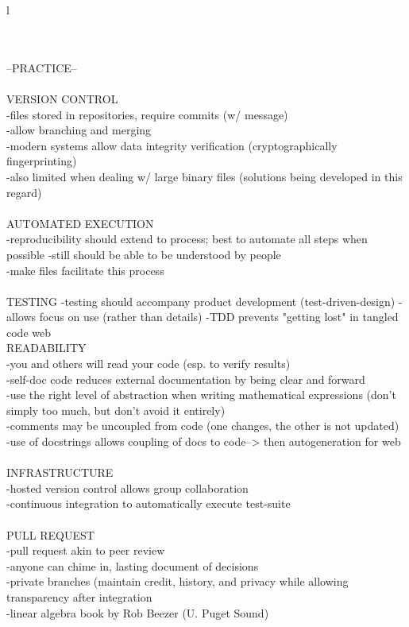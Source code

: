 l\documentclass{report}
\begin{document}
\-\\
\-\\
--PRACTICE--\\
\-\\
VERSION CONTROL\\
-files stored in repositories, require commits (w/ message)\\
-allow branching and merging\\
-modern systems allow data integrity verification (cryptographically fingerprinting)\\
-also limited when dealing w/ large binary files (solutions being developed in this regard)\\ 
\-\\
AUTOMATED EXECUTION\\
-reproducibility should extend to process; best to automate all steps when possible
-still should be able to be understood by people\\
-make files facilitate this process\\
\-\\
TESTING
-testing should accompany product development (test-driven-design)
-allows focus on use (rather than details)
-TDD prevents "getting lost" in tangled code web
\-\\
READABILITY\\
-you and others will read your code (esp. to verify results)\\
-self-doc code reduces external documentation by being clear and forward\\
-use the right level of abstraction when writing mathematical expressions (don't simply too much, but don't avoid it entirely)\\
-comments may be uncoupled from code (one changes, the other is not updated)\\
-use of docstrings allows coupling of docs to code--> then autogeneration for web\\
\-\\
INFRASTRUCTURE\\
-hosted version control allows group collaboration\\
-continuous integration to automatically execute test-suite\\
\-\\
PULL REQUEST\\
-pull request akin to peer review\\
-anyone can chime in, lasting document of decisions\\
-private branches (maintain credit, history, and privacy while allowing transparency after integration\\

-linear algebra book by Rob Beezer (U. Puget Sound)
\end{document}
